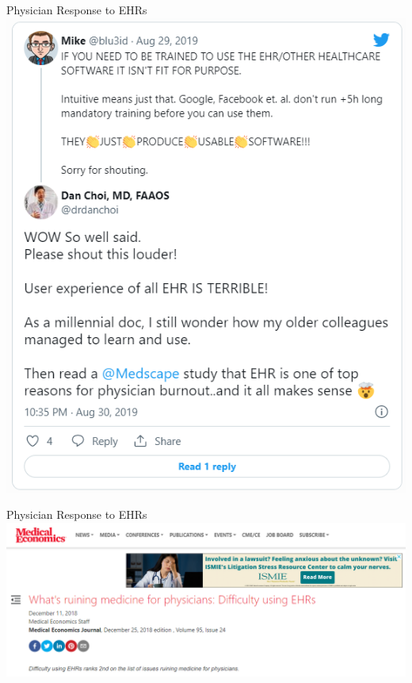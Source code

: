 \documentclass[notes,11pt, aspectratio=169]{beamer}
\begin{document}
\begin{frame}{Physician Response to EHRs}
\centering
\includegraphics[scale=.45]{Objects/EHR tweet.PNG}
\end{frame}

\begin{frame}{Physician Response to EHRs}
\centering
\includegraphics[scale=.5]{Objects/News Clip3.PNG}
\end{frame}
\end{document}
